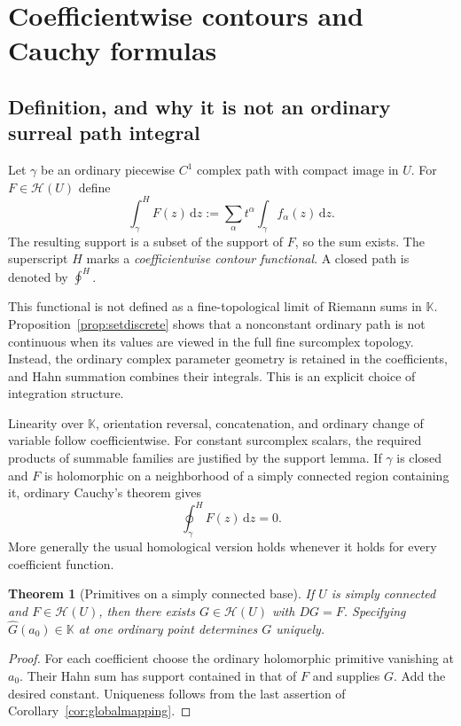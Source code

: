 \documentclass[11pt,a4paper]{article}
\newtheorem{theorem}{Theorem}[section]
\theoremstyle{definition}\newtheorem{definition}[theorem]{Definition}
\theoremstyle{remark}\newtheorem{remark}[theorem]{Remark}
\newcommand{\K}{\mathbb K}
\newcommand{\A}{\mathscr H}\newcommand{\hol}{\mathcal O}
\newcommand{\ev}[1]{\widehat{#1}}
\newcommand{\hoint}{\mathop{\oint}\nolimits^{\!H}}
\newcommand{\hint}{\mathop{\int}\nolimits^{\!H}}
\newcommand{\dd}{\,\mathrm d}
\numberwithin{equation}{section}
\begin{document}
\section{Coefficientwise contours and Cauchy formulas}\label{sec:contours}

\subsection{Definition, and why it is not an ordinary surreal path integral}
Let $\gamma$ be an ordinary piecewise $C^1$ complex path with compact image in $U$. For $F\in\A(U)$ define
\begin{equation}\label{eq:contourdefinition}
 \hint_\gamma F(z)\dd z
 :=\sum_{\alpha}t^\alpha\int_\gamma f_\alpha(z)\dd z.
\end{equation}
The resulting support is a subset of the support of $F$, so the sum exists. The superscript $H$ marks a \emph{coefficientwise contour functional}. A closed path is denoted by $\hoint$.

This functional is not defined as a fine-topological limit of Riemann sums in $\K$. Proposition~\ref{prop:setdiscrete} shows that a nonconstant ordinary path is not continuous when its values are viewed in the full fine surcomplex topology. Instead, the ordinary complex parameter geometry is retained in the coefficients, and Hahn summation combines their integrals. This is an explicit choice of integration structure.

Linearity over $\K$, orientation reversal, concatenation, and ordinary change of variable follow coefficientwise. For constant surcomplex scalars, the required products of summable families are justified by the support lemma. If $\gamma$ is closed and $F$ is holomorphic on a neighborhood of a simply connected region containing it, ordinary Cauchy's theorem gives
\begin{equation}\label{eq:Cauchytheorem}
 \hoint_\gamma F(z)\dd z=0.
\end{equation}
More generally the usual homological version holds whenever it holds for every coefficient function.

\begin{theorem}[Primitives on a simply connected base]\label{thm:coherentprimitive}
If $U$ is simply connected and $F\in\A(U)$, then there exists $G\in\A(U)$ with $DG=F$. Specifying $\ev G(a_0)\in\K$ at one ordinary point determines $G$ uniquely.
\end{theorem}
\begin{proof}
For each coefficient choose the ordinary holomorphic primitive vanishing at $a_0$. Their Hahn sum has support contained in that of $F$ and supplies $G$. Add the desired constant. Uniqueness follows from the last assertion of Corollary~\ref{cor:globalmapping}.
\end{proof}
\end{document}
